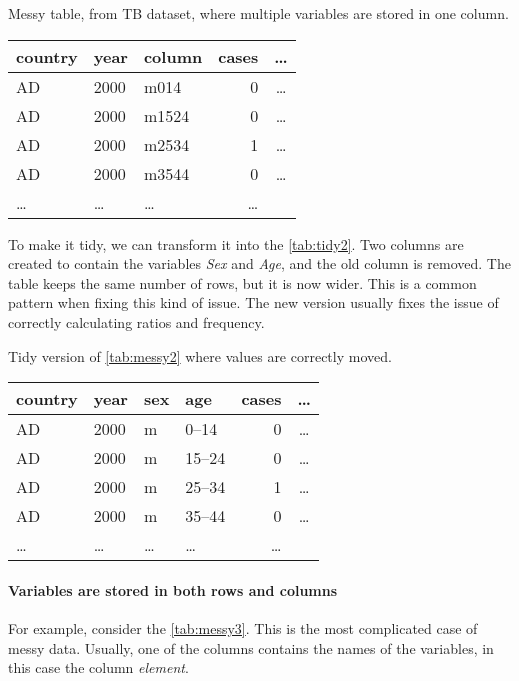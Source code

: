 \begin{tablebox}[label=tab:messy2]{Messy table, from TB dataset, where multiple variables are stored in one column.}
  \centering
  \begin{tabular}{l l l r c}
    \toprule
    country & year & column & cases & \dots \\
    \midrule
    AD & 2000 & m014 & 0 & \dots \\
    AD & 2000 & m1524 & 0 & \dots \\
    AD & 2000 & m2534 & 1 & \dots \\
    AD & 2000 & m3544 & 0 & \dots \\
    \dots & \dots & \dots & \dots \\
    \bottomrule
  \end{tabular}
\end{tablebox}

To make it tidy, we can transform it into the \cref{tab:tidy2}.  Two columns are created
to contain the variables \emph{Sex} and \emph{Age}, and the old column is removed.  The
table keeps the same number of rows, but it is now wider.  This is a common pattern when
fixing this kind of issue.  The new version usually fixes the issue of correctly
calculating ratios and frequency.

\begin{tablebox}[label=tab:tidy2]{Tidy version of \cref{tab:messy2} where values are correctly moved.}
  \centering
  \begin{tabular}{l l l l r c}
    \toprule
    country & year & sex & age & cases & \dots \\
    \midrule
    AD & 2000 & m & 0--14 & 0 & \dots \\
    AD & 2000 & m & 15--24 & 0 & \dots \\
    AD & 2000 & m & 25--34 & 1 & \dots \\
    AD & 2000 & m & 35--44 & 0 & \dots \\
    \dots & \dots & \dots & \dots & \dots \\
    \bottomrule
  \end{tabular}
\end{tablebox}

\clearpage
\paragraph{Variables are stored in both rows and columns}  For example, consider the
\cref{tab:messy3}.  This is the most complicated case of messy data.  Usually, one of the
columns contains the names of the variables, in this case the column \emph{element}.

